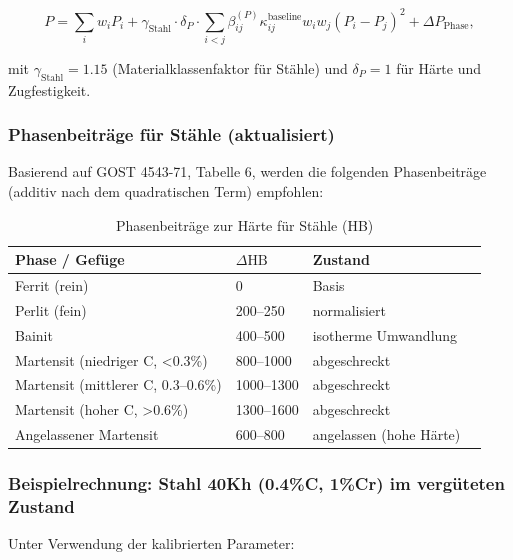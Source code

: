 \documentclass[12pt,a4paper]{article}
\begin{document}
	\[
	P = \sum_i w_i P_i + \gamma_{\text{Stahl}} \cdot \delta_P \cdot \sum_{i<j} \beta_{ij}^{(P)} \kappa_{ij}^{\text{baseline}} w_i w_j (P_i - P_j)^2 + \Delta P_{\text{Phase}},
	\]
	
	mit $\gamma_{\text{Stahl}} = 1.15$ (Materialklassenfaktor für Stähle) und $\delta_P = 1$ für Härte und Zugfestigkeit.
	
	\subsubsection{Phasenbeiträge für Stähle (aktualisiert)}
	
	Basierend auf GOST 4543-71, Tabelle 6, werden die folgenden Phasenbeiträge (additiv nach dem quadratischen Term) empfohlen:
	
	\begin{longtable}{p{3.5cm} p{3.0cm} p{3.0cm} p{4cm}}
		\caption{Phasenbeiträge zur Härte für Stähle (HB)}\label{tab:steel_phase_contrib_gost4543}\\
		\toprule
		\textbf{Phase / Gefüge} & $\Delta\text{HB}$ & \textbf{Zustand} \\
		\midrule
		Ferrit (rein) & 0 & Basis \\
		Perlit (fein) & 200–250 & normalisiert \\
		Bainit & 400–500 & isotherme Umwandlung \\
		Martensit (niedriger C, <0.3\%) & 800–1000 & abgeschreckt \\
		Martensit (mittlerer C, 0.3–0.6\%) & 1000–1300 & abgeschreckt \\
		Martensit (hoher C, >0.6\%) & 1300–1600 & abgeschreckt \\
		Angelassener Martensit & 600–800 & angelassen (hohe Härte) \\
		\bottomrule
	\end{longtable}
	
	\subsubsection{Beispielrechnung: Stahl 40Kh (0.4\%C, 1\%Cr) im vergüteten Zustand}
	
	Unter Verwendung der kalibrierten Parameter:
	
\end{document}
